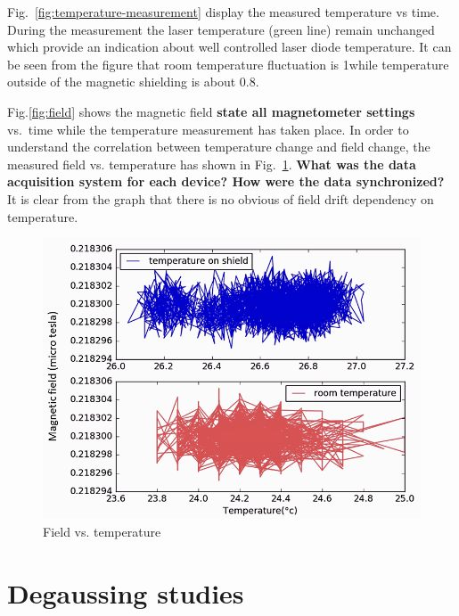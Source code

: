 Fig.~\ref{fig:temperature-measurement} display the measured
temperature vs time.  During the measurement the laser temperature
(green line) remain unchanged which provide an indication about well
controlled laser diode temperature.  It can be seen from the figure
that room temperature fluctuation is 1\degree while temperature
outside of the magnetic shielding is about 0.8\degree.
 
Fig.\ref{fig:field} shows the magnetic field {\bf state all
  magnetometer settings} vs.~time while the temperature measurement
has taken place. In order to understand the correlation between
temperature change and field change, the measured field
vs. temperature has shown in Fig.~\ref{fig:field_vs_temp}. {\bf What
  was the data acquisition system for each device?  How were the data
  synchronized?%
  }  It is clear from the graph that there is no obvious
of field drift dependency on temperature.
  
\begin{figure}%
\centering\includegraphics[width=0.6\linewidth]{figures/field_vs_temp.png}
\caption{Field vs. temperature\label{fig:field_vs_temp}}
\end{figure}
 
   
\section{Degaussing studies\label{sec:degaussing}}

